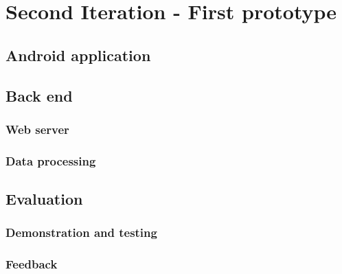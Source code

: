 \documentclass[../Main/thesis.tex]{subfiles}
\begin{document}
\chapter{Second Iteration  - First prototype}
\label{ch:development-2}

\section{Android application}

\section{Back end}
\subsection{Web server}
\subsection{Data processing}

\section{Evaluation}
\subsection{Demonstration and testing}
\subsection{Feedback}
\end{document}
